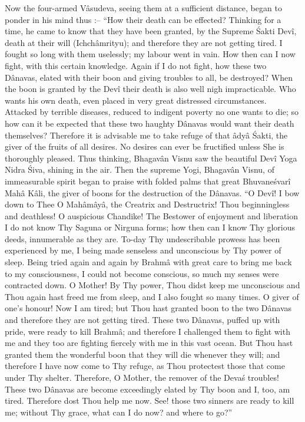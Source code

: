 Now the four-armed V\^asudeva, seeing them at a sufficient distance, began to ponder in his mind thus :-- ``How their death can be effected? Thinking for a time, he came to know that they have been granted, by the Supreme \'Sakti Dev\^i, death at their will (Ichch\^amrityu); and therefore they are not getting tired. I fought so long with them uselessly; my labour went in vain. How then can I now fight, with this certain knowledge. Again if I do not fight, how these two D\^anavas, elated with their boon and giving troubles to all, be destroyed? When the boon is granted by the Dev\^i their death is also well nigh impracticable. Who wants his own death, even placed in very great distressed circumstances. Attacked by terrible diseases, reduced to indigent poverty no one wants to die; so how can it be expected that these two haughty D\^anavas would want their death themselves? Therefore it is advisable me to take refuge of that \^ady\^a \'Sakti, the giver of the fruits of all desires. No desires can ever be fructified unless She is thoroughly pleased. Thus thinking, Bhagav\^an Visnu saw the beautiful Dev\^i Yoga Nidra \'Siva, shining in the air. Then the supreme Yogi, Bhagav\^an Visnu, of immeasurable spirit began to praise with folded palms that great Bhuvane\'svar\^i Mah\^a K\^ali, the giver of boons for the destruction of the D\^anavas. ``O Dev\^i! I bow down to Thee O Mah\^am\^ay\^a, the Creatrix and Destructrix! Thou beginningless and deathless! O auspicious Chandike! The Bestower of enjoyment and liberation I do not know Thy Saguna or Nirguna forms; how then can I know Thy glorious deeds, innumerable as they are. To-day Thy undescribable prowess has been experienced by me, I being made senseless and unconscious by Thy power of sleep. Being tried again and again by Brahm\^a with great care to bring me back to my consciousness, I could not become conscious, so much my senses were contracted down. O Mother! By Thy power, Thou didst keep me unconscious and Thou again hast freed me from sleep, and I also fought so many times. O giver of one's honour! Now I am tired; but Thou hast granted boon to the two D\^anavas and therefore they are not getting tired. These two D\^anavas, puffed up with pride, were ready to kill Brahm\^a; and therefore I challenged them to fight with me and they too are fighting fiercely with me in this vast ocean. But Thou hast granted them the wonderful boon that they will die whenever they will; and therefore I have now come to Thy refuge, as Thou protectest those that come under Thy shelter. Therefore, O Mother, the remover of the Deva\'s troubles! These two D\^anavas are become exceedingly elated by Thy boon and I, too, am tired. Therefore dost Thou help me now. See! those two sinners are ready to kill me; without Thy grace, what can I do now? and where to go?''

